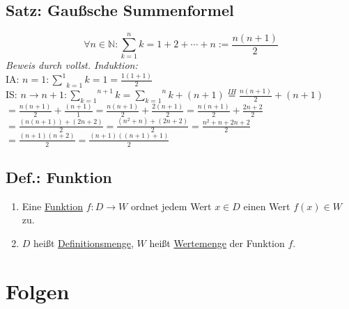 \documentclass[a4paper,11pt]{article}
\begin{document}
\subsection{Satz: Gaußsche Summenformel}
\begin{equation} \label{gauß1}
	\forall n\in\mathbb{N}:\underset{k=1}{\overset{n}{\sum}}k=1+2+\cdots+n:=\frac{n(n+1)}{2}
\end{equation}
\emph{Beweis durch vollst. Induktion:}\\
IA: $n=1:\underset{k=1}{\overset{1}{\sum}}k=1=\frac{1(1+1)}{2}$\\
IS: $n\rightarrow n+1:\overset{n+1}{\underset{k=1}{\sum}}k=\overset{n}{\underset{k=1}{\sum}}k+(n+1)\overset{IH}{=}\frac{n(n+1)}{2}+(n+1)$\\
$=\frac{n(n+1)}{2}+\frac{(n+1)}{1}=\frac{n(n+1)}{2}+\frac{2(n+1)}{2}=\frac{n(n+1)}{2}+\frac{2n+2}{2}$\\
$=\frac{(n(n+1))+(2n+2)}{2}=\frac{(n^2+n)+(2n+2)}{2}=\frac{n^2+n+2n+2}{2}$\\
$=\frac{(n+1)(n+2)}{2}=\frac{(n+1)((n+1)+1)}{2}$
\subsection{Def.: Funktion}
\begin{enumerate}[label={\alph*)}]
	\item Eine \underline{Funktion} $f:D\to W$ ordnet jedem Wert $x\in D$ einen Wert $f(x)\in W$ zu.
	\item $D$ heißt \underline{Definitionsmenge}, $W$ heißt \underline{Wertemenge} der Funktion $f$.
\end{enumerate}
\section{Folgen}
\end{document}
